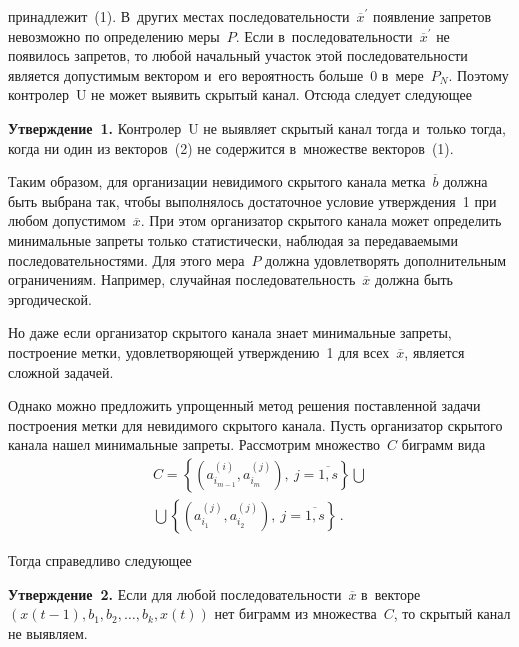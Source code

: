 \begin{multicols}{2}
  \vspace*{-2pt}

  \noindent
принадлежит~(1). В~других местах последовательности~$\overline{x}^\prime$
появление запретов невозможно по определению меры~$P$. Если
в~последовательности~$\overline{x}^\prime$ не появилось запретов, то любой
начальный учас\-ток этой последовательности является допустимым вектором
и~его вероятность больше~0 в~мере~$P_N$. Поэтому контролер~U не может
выявить скрытый канал. Отсюда следует следующее

  \smallskip

  \noindent
  \textbf{Утверждение~1.} Контролер~U не выявляет скрытый канал тогда
и~только тогда, когда ни один из векторов~(2) не содержится в~множестве
векторов~(1).

  \smallskip

  Таким образом, для организации невидимого скрытого канала
метка~$\overline{b}$ должна быть выбрана так, чтобы выполнялось
достаточное условие утверждения~1 при любом допустимом~$\overline{x}$.
При этом организатор скрытого канала может определить минимальные
запреты только статистически, наблюдая за передаваемыми
последовательностями. Для этого мера~$P$ должна удовлетворять
дополнительным ограничениям. Например, случайная
последовательность~$\overline{x}$ должна быть эргодической.

  Но даже если организатор скрытого канала знает минимальные запреты,
построение метки, удовле\-тво\-ря\-ющей утверждению~1 для всех~$\overline{x}$,
является сложной задачей.

  Однако можно предложить упрощенный метод решения поставленной задачи
построения метки для невидимого скрытого канала. Пусть организатор
скрытого канала нашел минимальные запреты. Рассмотрим множество~$C$
биграмм вида
  \begin{multline*}
  C=\left\{ \left( a^{(i)}_{i_{m-1}}, a^{(j)}_{i_m}\right),\
  j=\overline{1,s}\right\}\bigcup{}\\
  {}\bigcup \left\{ \left( a^{(j)}_{i_1}, a^{(j)}_{i_2}\right),\
  j=\overline{1,s}\right\}\,.
  \end{multline*}

  Тогда справедливо следующее

  \smallskip

  \noindent
  \textbf{Утверждение~2.} Если для любой
последовательности~$\overline{x}$ в~векторе $(x(t-1),b_1,b_2,\ldots ,b_k,x(t))$
нет биграмм из множества~$C$, то скрытый канал не выявляем.


\end{multicols}
